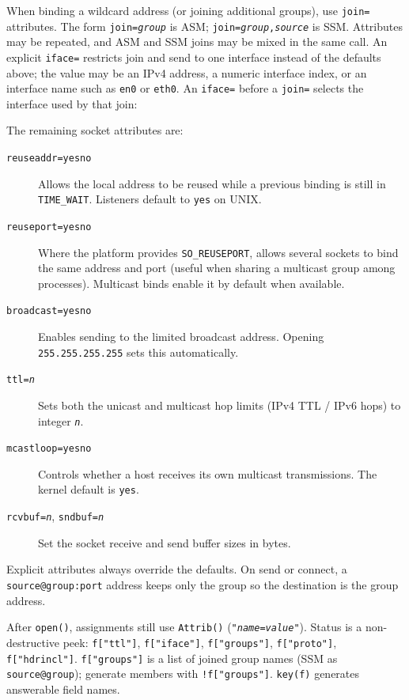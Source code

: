 When binding a wildcard address (or joining additional groups), use
\texttt{join=} attributes. The form \texttt{join=\textit{group}} is ASM;
\texttt{join=\textit{group},\textit{source}} is SSM. Attributes may be
repeated, and ASM and SSM joins may be mixed in the same call. An
explicit \texttt{iface=} restricts join and send to one interface
instead of the defaults above; the value may be an IPv4 address, a
numeric interface index, or an interface name such as \texttt{en0} or
\texttt{eth0}. An \texttt{iface=} before a \texttt{join=} selects the
interface used by that join:


The remaining socket attributes are:

\begin{description}
\item[\texttt{reuseaddr=yes{\textbar}no}]
Allows the local address to be reused while a previous binding is
still in \texttt{TIME\_WAIT}. Listeners default to \texttt{yes} on
UNIX.
\item[\texttt{reuseport=yes{\textbar}no}]
Where the platform provides \texttt{SO\_REUSEPORT}, allows several
sockets to bind the same address and port (useful when sharing a
multicast group among processes). Multicast binds enable it by
default when available.
\item[\texttt{broadcast=yes{\textbar}no}]
Enables sending to the limited broadcast address. Opening
\texttt{255.255.255.255} sets this automatically.
\item[\texttt{ttl=\textit{n}}]
Sets both the unicast and multicast hop limits (IPv4 TTL /
IPv6 hops) to integer \texttt{\textit{n}}.
\item[\texttt{mcastloop=yes{\textbar}no}]
Controls whether a host receives its own multicast transmissions.
The kernel default is \texttt{yes}.
\item[\texttt{rcvbuf=\textit{n}}, \texttt{sndbuf=\textit{n}}]
Set the socket receive and send buffer sizes in bytes.
\end{description}

Explicit attributes always override the defaults. On send or connect,
a \texttt{source@group:port} address keeps only the group so the
destination is the group address.

After \texttt{open()}, assignments still use
\texttt{Attrib()} (\texttt{"\textit{name}=\textit{value}"}).
Status is a non-destructive peek: \texttt{f["ttl"]}, \texttt{f["iface"]},
\texttt{f["groups"]}, \texttt{f["proto"]}, \texttt{f["hdrincl"]}.
\texttt{f["groups"]} is a list of joined group names (SSM as
\texttt{source@group}); generate members with \texttt{!f["groups"]}.
\texttt{key(f)} generates answerable field names.

